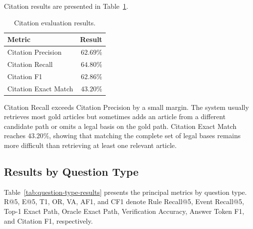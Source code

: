 Citation results are presented in Table~\ref{tab:citation-results}.

\begin{table}[t]
    \centering
    \caption{Citation evaluation results.}
    \label{tab:citation-results}
    \begin{tabular}{lr}
        \hline
        \textbf{Metric} & \textbf{Result} \\
        \hline
        Citation Precision & \(62.69\%\) \\
        Citation Recall & \(64.80\%\) \\
        Citation F1 & \(62.86\%\) \\
        Citation Exact Match & \(43.20\%\) \\
        \hline
    \end{tabular}
\end{table}

Citation Recall exceeds Citation Precision by a small margin. The system
usually retrieves most gold articles but sometimes adds an article from a
different candidate path or omits a legal basis on the gold path. Citation
Exact Match reaches \(43.20\%\), showing that matching the complete set of
legal bases remains more difficult than retrieving at least one relevant
article.

\subsection{Results by Question Type}

Table~\ref{tab:question-type-results} presents the principal metrics by
question type. R@5, E@5, T1, OR, VA, AF1, and CF1 denote Rule Recall@5,
Event Recall@5, Top-1 Exact Path, Oracle Exact Path, Verification Accuracy,
Answer Token F1, and Citation F1, respectively.

